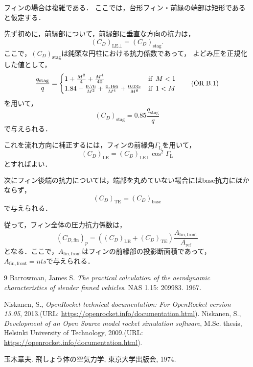 \documentclass[uplatex,dvipdfmx,a4j,11pt]{jsarticle}
\begin{document}
\enskip

フィンの場合は複雑である．
ここでは，台形フィン・前縁の端部は矩形であると仮定する．

先ず初めに，前縁部について，前縁部に垂直な方向の抗力は，
\begin{equation}
  (C_{D})_{\text{LE} \perp} = (C_{D})_\mathrm{stag}.
  \tag{OR.3.90}
\end{equation}
ここで，$(C_{D})_\mathrm{stag}$は鈍頭な円柱における抗力係数であって，
よどみ圧を正規化した値として，
\begin{equation}
  \frac{q_\text{stag}}{q} = \begin{cases}
    1 + \frac{M^2}{4} + \frac{M^4}{40} & \text{if\, } M < 1 \\
    1.84 - \frac{0.76}{M^2} + \frac{0.166}{M^4} + \frac{0.035}{M^6} & \text{if\, } 1 < M \\
  \end{cases}
  \tag{OR.B.1}
\end{equation}
を用いて，
\begin{equation}
  (C_{D})_\mathrm{stag} = 0.85\frac{q_\text{stag}}{q}
  \tag{OR.B.2}
\end{equation}
で与えられる．

これを流れ方向に補正するには，フィンの前縁角$\Gamma_\text{L}$を用いて，
\begin{equation}
  (C_{D})_{\text{LE}} = (C_{D})_{\text{LE} \perp} \cos^2 \Gamma_\text{L}
  \tag{OR.3.91}
\end{equation}
とすればよい．

次にフィン後端の抗力については，端部を丸めていない場合にはbase抗力にほかならず，
\begin{equation}
  (C_{D})_{\text{TE}} = (C_{D})_\mathrm{base}
  \tag{OR.3.92}
\end{equation}
で与えられる．

従って，フィン全体の圧力抗力係数は，
\begin{equation}
  (C_{D, \text{fin}})_p = \left((C_{D})_{\text{LE}} + (C_{D})_{\text{TE}}\right) \frac{A_\mathrm{fin, front}}{A_\mathrm{ref}}
  \tag{OR.3.93}
\end{equation}
となる．ここで，$A_\mathrm{fin, front}$はフィンの前縁部の投影断面積であって，$A_\mathrm{fin, front} = n ts$で与えられる．

\begin{thebibliography}{9}
 Barrowman, James S. \textit{The practical calculation of the aerodynamic characteristics of slender finned vehicles}. NAS 1.15: 209983. 1967.

 Niskanen, S., \textit{OpenRocket technical documentation: For OpenRocket version 13.05}, 2013.(URL: \url{https://openrocket.info/documentation.html}).
 Niskanen, S., \textit{Development of an Open Source model rocket simulation software}, M.Sc. thesis, Helsinki University of Technology, 2009.(URL: \url{https://openrocket.info/documentation.html}).

 玉木章夫. 飛しょう体の空気力学, 東京大学出版会, 1974.
\end{thebibliography}
\end{document}
